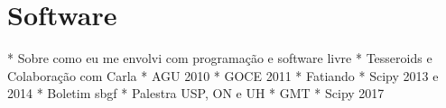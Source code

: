 \section{Software}

* Sobre como eu me envolvi com programação e software livre
* Tesseroids e Colaboração com Carla
* AGU 2010
* GOCE 2011
* Fatiando
* Scipy 2013 e 2014
* Boletim sbgf
* Palestra USP, ON e UH
* GMT
* Scipy  2017
